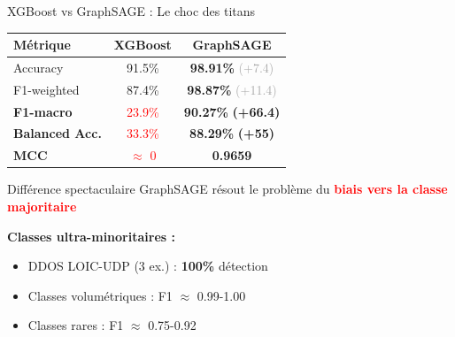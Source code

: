﻿\documentclass[aspectratio=169]{beamer}
\begin{document}
\begin{frame}{XGBoost vs GraphSAGE : Le choc des titans}
\begin{center}
\begin{tabular}{lcc}
\toprule
\textbf{Métrique} & \textbf{XGBoost} & \textbf{GraphSAGE} \\
\midrule
Accuracy & 91.5\% & \textcolor{accentorange}{\textbf{98.91\%}} \textcolor{darkgray}{(+7.4)} \\
F1-weighted & 87.4\% & \textcolor{accentorange}{\textbf{98.87\%}} \textcolor{darkgray}{(+11.4)} \\
\textbf{F1-macro} & \textcolor{red}{23.9\%} & \textcolor{accentorange}{\textbf{90.27\%}} \textcolor{accentorange}{\textbf{(+66.4)}} \\
\textbf{Balanced Acc.} & \textcolor{red}{33.3\%} & \textcolor{accentorange}{\textbf{88.29\%}} \textcolor{accentorange}{\textbf{(+55)}} \\
\textbf{MCC} & \textcolor{red}{$\approx$ 0} & \textcolor{accentorange}{\textbf{0.9659}} \\
\bottomrule
\end{tabular}
\end{center}

\vspace{0.5cm}

\begin{block}{Différence spectaculaire}
GraphSAGE résout le problème du \textcolor{red}{\textbf{biais vers la classe majoritaire}}
\end{block}

\vspace{0.3cm}

\textbf{Classes ultra-minoritaires :}
\begin{itemize}
    \item DDOS LOIC-UDP (3 ex.) : \textcolor{accentorange}{\textbf{100\%}} détection
    \item Classes volumétriques : F1 $\approx$ 0.99-1.00
    \item Classes rares : F1 $\approx$ 0.75-0.92
\end{itemize}
\end{frame}
\end{document}
